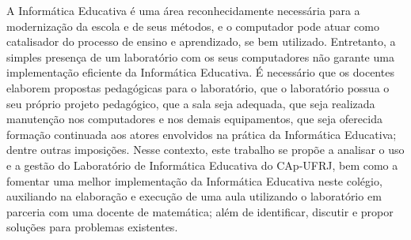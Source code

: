 A Informática Educativa é uma área reconhecidamente necessária para a modernização da escola e de seus métodos, e o computador pode atuar como catalisador do processo de ensino e aprendizado, se bem utilizado. Entretanto, a simples presença de um laboratório com os seus computadores não garante uma implementação eficiente da Informática Educativa. É necessário que os docentes elaborem propostas pedagógicas para o laboratório, que o laboratório possua o seu próprio projeto pedagógico, que a sala seja adequada, que seja realizada manutenção nos computadores e nos demais equipamentos, que seja oferecida formação continuada aos atores envolvidos na prática da Informática Educativa; dentre outras imposições.
Nesse contexto, este trabalho se propõe a analisar o uso e a gestão do Laboratório de Informática Educativa do CAp-UFRJ, bem como a fomentar uma melhor implementação da Informática Educativa neste colégio, auxiliando na elaboração e execução de uma aula utilizando o laboratório em parceria com uma docente de matemática; além de identificar, discutir e propor soluções para problemas existentes.